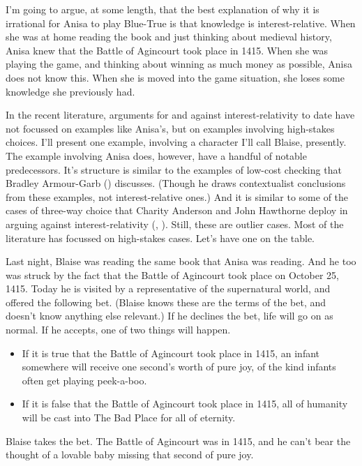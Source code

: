 \documentclass[
  12pt,
  letterpaper,
]{scrbook}
\providecommand{\tightlist}{%
  \setlength{\itemsep}{0pt}\setlength{\parskip}{0pt}}\usepackage{longtable,booktabs,array}
\begin{document}
I'm going to argue, at some length, that the best explanation of why it
is irrational for Anisa to play Blue-True is that knowledge is
interest-relative. When she was at home reading the book and just
thinking about medieval history, Anisa knew that the Battle of Agincourt
took place in 1415. When she was playing the game, and thinking about
winning as much money as possible, Anisa does not know this. When she is
moved into the game situation, she loses some knowledge she previously
had.

In the recent literature, arguments for and against interest-relativity
to date have not focussed on examples like Anisa's, but on examples
involving high-stakes choices. I'll present one example, involving a
character I'll call Blaise, presently. The example involving Anisa does,
however, have a handful of notable predecessors. It's structure is
similar to the examples of low-cost checking that Bradley Armour-Garb
() discusses. (Though he draws
contextualist conclusions from these examples, not interest-relative
ones.) And it is similar to some of the cases of three-way choice that
Charity Anderson and John Hawthorne deploy in arguing against
interest-relativity (,
). Still, these are outlier
cases. Most of the literature has focussed on high-stakes cases. Let's
have one on the table.

Last night, Blaise was reading the same book that Anisa was reading. And
he too was struck by the fact that the Battle of Agincourt took place on
October 25, 1415. Today he is visited by a representative of the
supernatural world, and offered the following bet. (Blaise knows these
are the terms of the bet, and doesn't know anything else relevant.) If
he declines the bet, life will go on as normal. If he accepts, one of
two things will happen.

\begin{itemize}
\tightlist
\item
  If it is true that the Battle of Agincourt took place in 1415, an
  infant somewhere will receive one second's worth of pure joy, of the
  kind infants often get playing peek-a-boo.
\item
  If it is false that the Battle of Agincourt took place in 1415, all of
  humanity will be cast into The Bad Place for all of eternity.
\end{itemize}

Blaise takes the bet. The Battle of Agincourt was in 1415, and he can't
bear the thought of a lovable baby missing that second of pure joy.
\end{document}
